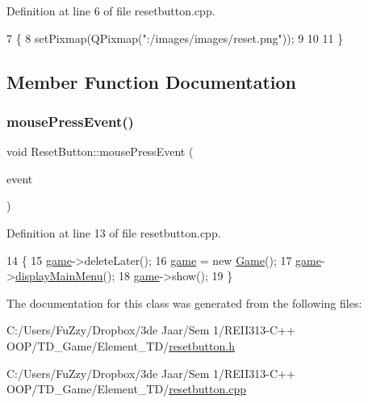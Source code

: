 Definition at line 6 of file resetbutton.\+cpp.


\begin{DoxyCode}
7 \{
8     setPixmap(QPixmap(\textcolor{stringliteral}{":/images/images/reset.png"}));
9 
10 
11 \}
\end{DoxyCode}


\subsection{Member Function Documentation}
\mbox{\label{class_reset_button_a21e661fcbc9e266ee9fa76a9feba8401}} 
\subsubsection{\texorpdfstring{mouse\+Press\+Event()}{mousePressEvent()}}
{\footnotesize\ttfamily void Reset\+Button\+::mouse\+Press\+Event (\begin{DoxyParamCaption}\item[{Q\+Graphics\+Scene\+Mouse\+Event $\ast$}]{event }\end{DoxyParamCaption})}



Definition at line 13 of file resetbutton.\+cpp.


\begin{DoxyCode}
14 \{
15     \hyperlink{resetbutton_8cpp_a58bdb5643d0814ac4e697a1564b79b70}{game}->deleteLater();
16     \hyperlink{resetbutton_8cpp_a58bdb5643d0814ac4e697a1564b79b70}{game} = \textcolor{keyword}{new} \hyperlink{class_game}{Game}();
17     \hyperlink{resetbutton_8cpp_a58bdb5643d0814ac4e697a1564b79b70}{game}->\hyperlink{class_game_af74fd203e3b31917ca9d4769fa608c48}{displayMainMenu}();
18     \hyperlink{resetbutton_8cpp_a58bdb5643d0814ac4e697a1564b79b70}{game}->show();
19 \}
\end{DoxyCode}


The documentation for this class was generated from the following files\+:\begin{DoxyCompactItemize}
\item 
C\+:/\+Users/\+Fu\+Zzy/\+Dropbox/3de Jaar/\+Sem 1/\+R\+E\+I\+I313-\/\+C++ O\+O\+P/\+T\+D\+\_\+\+Game/\+Element\+\_\+\+T\+D/\hyperlink{resetbutton_8h}{resetbutton.\+h}\item 
C\+:/\+Users/\+Fu\+Zzy/\+Dropbox/3de Jaar/\+Sem 1/\+R\+E\+I\+I313-\/\+C++ O\+O\+P/\+T\+D\+\_\+\+Game/\+Element\+\_\+\+T\+D/\hyperlink{resetbutton_8cpp}{resetbutton.\+cpp}\end{DoxyCompactItemize}
